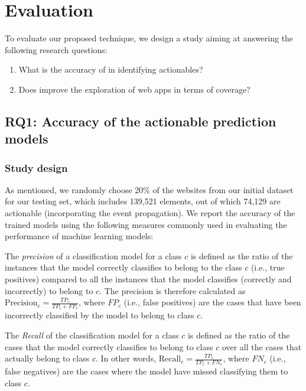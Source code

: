 
\section{Evaluation}
\label{sec:evaluation}

To evaluate our proposed technique,
we design a study aiming at answering
the following research questions:

\begin{enumerate}[label=\textbf{RQ\arabic*}, leftmargin=*]
	\item What is the accuracy of \toolName in identifying actionables?
	\item Does \toolName improve the
	exploration of web apps in terms of coverage?
\end{enumerate}



\subsection{RQ1: Accuracy of the actionable prediction models}

\subsubsection{Study design}
As mentioned,
we randomly choose 20\% of the websites 
from our initial dataset
for our testing set,
which includes 139,521 elements,
out of which 74,129 are actionable
(incorporating the event propagation).
We report the accuracy of the trained models
using the following measures commonly used in
evaluating the performance of machine learning models:

 The \textit{precision} of a classification model
for a class $c$
is defined as the ratio of the instances that the model correctly classifies 
to belong to the class $c$
(i.e., true positives)
compared to all the instances that the model classifies (correctly and incorrectly) to belong to $c$.
The precision is therefore calculated as
$\text{Precision}_{c} = \frac{TP_{c}}{TP_{c} + FP_{c}}$,
where $FP_{c}$ (i.e., false positives) are the cases that have been incorrectly classified by the model
to belong to class $c$.

 The \textit{Recall} of the classification model
for a class $c$
is defined as the ratio of the cases that the model correctly classifies 
to belong to class $c$
over all the cases that actually belong to class $c$.
In other words, $\text{Recall}_{c} = \frac{TP_{c}}{TP_{c} + FN_{c}}$,
where $FN_{c}$ (i.e., false negatives) are the cases 
where the model have missed classifying them to class $c$.

